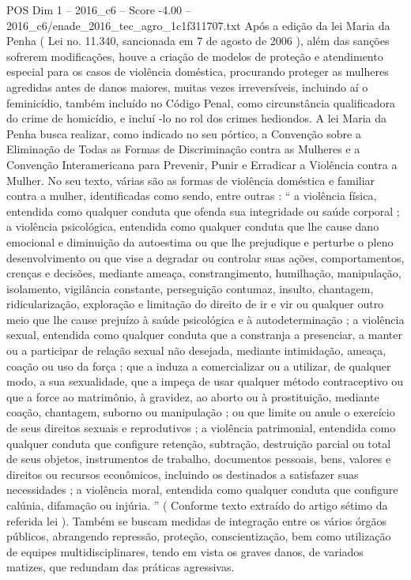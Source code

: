 \begin{textsample}{POS Dim 1 – 2016\_c6 – Score -4.00 – 2016\_c6/enade\_2016\_tec\_agro\_1c1f311707.txt}
Após a edição da lei Maria da Penha ( Lei no. 11.340, sancionada em 7 de agosto de 2006 ), além das sanções sofrerem modificações, houve a criação de modelos de proteção e atendimento especial para os casos de violência doméstica, procurando proteger as mulheres agredidas antes de danos maiores, muitas vezes irreversíveis, incluindo aí o feminicídio, também incluído no Código Penal, como circunstância qualificadora do crime de homicídio, e incluí -lo no rol dos crimes hediondos.
A lei Maria da Penha busca realizar, como indicado no seu pórtico, a Convenção sobre a Eliminação de Todas as Formas de Discriminação contra as Mulheres e a Convenção Interamericana para Prevenir, Punir e Erradicar a Violência contra a Mulher.
No seu texto, várias são as formas de violência doméstica e familiar contra a mulher, identificadas como sendo, entre outras : “ a violência física, entendida como qualquer conduta que ofenda sua integridade ou saúde corporal ; a violência psicológica, entendida como qualquer conduta que lhe cause dano emocional e diminuição da autoestima ou que lhe prejudique e perturbe o pleno desenvolvimento ou que vise a degradar ou controlar suas ações, comportamentos, crenças e decisões, mediante ameaça, constrangimento, humilhação, manipulação, isolamento, vigilância constante, perseguição contumaz, insulto, chantagem, ridicularização, exploração e limitação do direito de ir e vir ou qualquer outro meio que lhe cause prejuízo à saúde psicológica e à autodeterminação ; a violência sexual, entendida como qualquer conduta que a constranja a presenciar, a manter ou a participar de relação sexual não desejada, mediante intimidação, ameaça, coação ou uso da força ; que a induza a comercializar ou a utilizar, de qualquer modo, a sua sexualidade, que a impeça de usar qualquer método contraceptivo ou que a force ao matrimônio, à gravidez, ao aborto ou à prostituição, mediante coação, chantagem, suborno ou manipulação ; ou que limite ou anule o exercício de seus direitos sexuais e reprodutivos ; a violência patrimonial, entendida como qualquer conduta que configure retenção, subtração, destruição parcial ou total de seus objetos, instrumentos de trabalho, documentos pessoais, bens, valores e direitos ou recursos econômicos, incluindo os destinados a satisfazer suas necessidades ; a violência moral, entendida como qualquer conduta que configure calúnia, difamação ou injúria. ” ( Conforme texto extraído do artigo sétimo da referida lei ).
Também se buscam medidas de integração entre os vários órgãos públicos, abrangendo repressão, proteção, conscientização, bem como utilização de equipes multidisciplinares, tendo em vista os graves danos, de variados matizes, que redundam das práticas agressivas.

\end{textsample}
